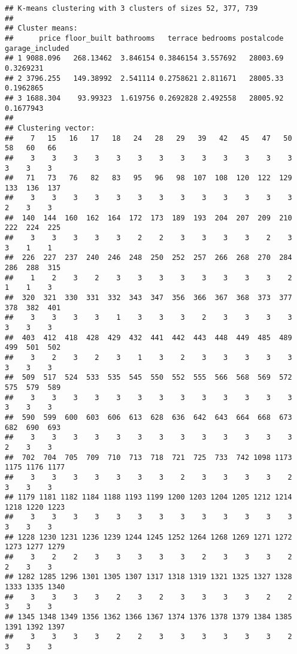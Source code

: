 \documentclass[
]{article}
\begin{document}
\begin{verbatim}
## K-means clustering with 3 clusters of sizes 52, 377, 739
## 
## Cluster means:
##      price floor_built bathrooms   terrace bedrooms postalcode garage_included
## 1 9088.096   268.13462  3.846154 0.3846154 3.557692   28003.69       0.3269231
## 2 3796.255   149.38992  2.541114 0.2758621 2.811671   28005.33       0.1962865
## 3 1688.304    93.99323  1.619756 0.2692828 2.492558   28005.92       0.1677943
## 
## Clustering vector:
##    7   15   16   17   18   24   28   29   39   42   45   47   50   58   60   66 
##    3    3    3    3    3    3    3    3    3    3    3    3    3    3    3    3 
##   71   73   76   82   83   95   96   98  107  108  120  122  129  133  136  137 
##    3    3    3    3    3    3    3    3    3    3    3    3    3    2    3    3 
##  140  144  160  162  164  172  173  189  193  204  207  209  210  222  224  225 
##    3    3    3    3    3    2    2    3    3    3    3    2    3    3    1    1 
##  226  227  237  240  246  248  250  252  257  266  268  270  284  286  288  315 
##    1    2    3    2    3    3    3    3    3    3    3    3    2    1    1    3 
##  320  321  330  331  332  343  347  356  366  367  368  373  377  378  382  401 
##    3    3    3    3    1    3    3    3    2    3    3    3    3    3    3    3 
##  403  412  418  428  429  432  441  442  443  448  449  485  489  499  501  502 
##    3    2    3    2    3    1    3    2    3    3    3    3    3    3    3    3 
##  509  517  524  533  535  545  550  552  555  566  568  569  572  575  579  589 
##    3    3    3    3    3    3    3    3    3    3    3    3    3    3    3    3 
##  590  599  600  603  606  613  628  636  642  643  664  668  673  682  690  693 
##    3    3    3    3    3    3    3    3    3    3    3    3    3    2    3    3 
##  702  704  705  709  710  713  718  721  725  733  742 1098 1173 1175 1176 1177 
##    3    3    3    3    3    3    3    2    3    3    3    3    2    3    3    3 
## 1179 1181 1182 1184 1188 1193 1199 1200 1203 1204 1205 1212 1214 1218 1220 1223 
##    3    3    3    3    3    3    3    3    3    3    3    3    3    3    3    3 
## 1228 1230 1231 1236 1239 1244 1245 1252 1264 1268 1269 1271 1272 1273 1277 1279 
##    3    2    2    3    3    3    3    3    2    3    3    3    2    2    3    3 
## 1282 1285 1296 1301 1305 1307 1317 1318 1319 1321 1325 1327 1328 1333 1335 1340 
##    3    3    3    3    2    3    2    3    3    3    3    2    2    3    3    3 
## 1345 1348 1349 1356 1362 1366 1367 1374 1376 1378 1379 1384 1385 1391 1392 1397 
##    3    3    3    3    2    2    3    3    3    3    3    3    2    3    3    3 

\end{verbatim}
\end{document}
